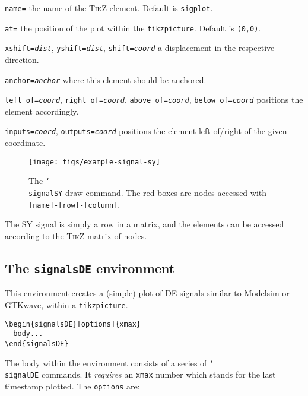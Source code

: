 \begin{optionslist}
\item \texttt{name=} the name of the \textsc{TikZ} element. Default is \texttt{sigplot}.
\item \texttt{at=} the position of the plot within the \texttt{tikzpicture}. Default is \texttt{(0,0)}.
\item \texttt{xshift=\it dist}, \texttt{yshift=\it dist}, \texttt{shift=\it coord} a displacement in the respective direction.
\item \texttt{anchor=\it anchor} where this element should be anchored.
\item \texttt{left of=\it coord}, \texttt{right of=\it coord}, \texttt{above of=\it coord}, \texttt{below of=\it coord} positions the element accordingly.
\item \texttt{inputs=\it coord}, \texttt{outputs=\it coord} positions the element left of/right of the given coordinate.
\end{optionslist}

\begin{figure}[htb]\centering
\texttt{[image: figs/example-signal-sy]}

\caption{The \texttt{\char`\\signalSY} draw command. The red boxes are nodes accessed with \texttt{[name]-[row]-[column]}.}
\end{figure}
\hspace{1pt}

\noindent The SY signal is simply a row in a matrix, and the elements can be accessed according to the \textsc{TikZ} matrix of nodes.

\subsection{The \texttt{signalsDE} environment}
\label{sec:plot-signalsDE}

This environment creates a (simple) plot of DE signals similar to Modelsim or GTKwave, within a \texttt{tikzpicture}.

\begin{verbatim}
\begin{signalsDE}[options]{xmax}
  body...
\end{signalsDE}
\end{verbatim}

The body within the environment consists of a series of \texttt{\char`\\signalDE} commands. It \emph{requires} an \texttt{xmax} number which stands for the last timestamp plotted. The \texttt{options} are:

